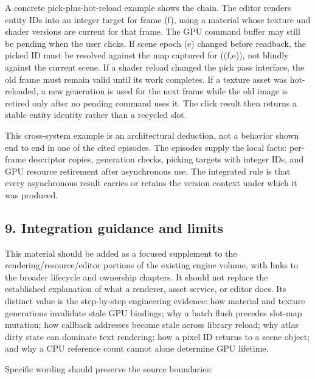 A concrete pick-plus-hot-reload example shows the chain. The editor renders entity IDs into an integer target for frame (f), using a material whose texture and shader versions are current for that frame. The GPU command buffer may still be pending when the user clicks. If scene epoch (e) changed before readback, the picked ID must be resolved against the map captured for ((f,e)), not blindly against the current scene. If a shader reload changed the pick pass interface, the old frame must remain valid until its work completes. If a texture asset was hot-reloaded, a new generation is used for the next frame while the old image is retired only after no pending command uses it. The click result then returns a stable entity identity rather than a recycled slot.

This cross-system example is an architectural deduction, not a behavior shown end to end in one of the cited episodes. The episodes supply the local facts: per-frame descriptor copies, generation checks, picking targets with integer IDs, and GPU resource retirement after asynchronous use. The integrated rule is that every asynchronous result carries or retains the version context under which it was produced.

\subsection{9. Integration guidance and limits}\label{06-engine-ii-ch041-integration-guidance-and-limits}

\hypertarget{06-engine-ii-ch041-integration-guidance-and-limits}{}

This material should be added as a focused supplement to the rendering/resource/editor portions of the existing engine volume, with links to the broader lifecycle and ownership chapters. It should not replace the established explanation of what a renderer, asset service, or editor does. Its distinct value is the step-by-step engineering evidence: how material and texture generations invalidate stale GPU bindings; why a batch flush precedes slot-map mutation; how callback addresses become stale across library reload; why atlas dirty state can dominate text rendering; how a pixel ID returns to a scene object; and why a CPU reference count cannot alone determine GPU lifetime.

Specific wording should preserve the source boundaries:

